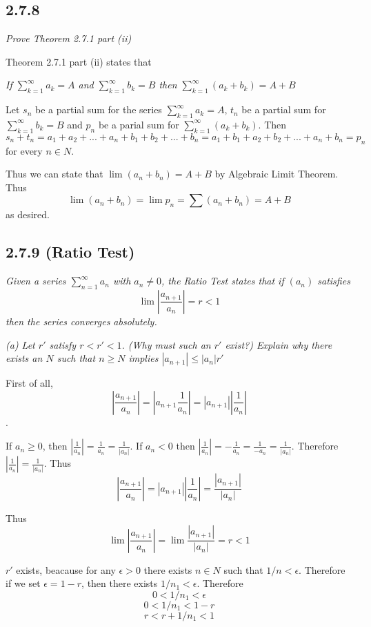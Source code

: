 \documentclass[11pt,oneside,titlepage]{book}
\begin{document}
\subsection*{2.7.8}
\textit{Prove Theorem 2.7.1 part (ii)}

Theorem 2.7.1 part (ii) states that

\textit{If $\sum_{k = 1}^{\infty} a_k = A$ and $\sum_{k = 1}^{\infty} b_k = B$
then $\sum_{k = 1}^{\infty} (a_k + b_k) = A + B$}

Let $s_n$ be a partial sum for the series $\sum_{k = 1}^{\infty} a_k = A$,
$t_n$ be a partial sum for $\sum_{k = 1}^{\infty} b_k = B$ and
$p_n$ be a parial sum for $\sum_{k = 1}^{\infty} (a_k + b_k)$. Then
$$s_n + t_n = a_1 + a_2 + ... + a_n + b_1 + b_2 + ... + b_n =
a_1 + b_1 + a_2 + b_2 + ... + a_n + b_n = p_n $$
for every $n \in N$. 

Thus we can state that $\lim (a_n + b_n) = A + B$ by Algebraic Limit Theorem.
Thus 
$$\lim (a_n + b_n) = \lim p_n = \sum (a_n + b_n) = A + B$$
as desired.

\subsection*{2.7.9 (Ratio Test)}
\textit{Given a series $\sum_{n = 1}^{\infty} a_n$ with $a_n \neq 0$, the
  Ratio Test states that if $(a_n)$ satisfies}
$$\lim|\frac{a_{n + 1}}{a_n}| = r < 1$$
\textit{then the series converges absolutely.}

\textit{(a) Let $r'$ satisfy $r < r' < 1$. (Why must such an $r'$ exist?)
  Explain why there exists an $N$ such that $n \geq N$ implies
  $|a_{n + 1}| \leq |a_n|r'$}

First of all,
$$|\frac{a_{n + 1}}{a_n}| = |a_{n + 1} \frac{1}{a_n}| =
|a_{n + 1}| |\frac{1}{a_n}|$$.

If  $a_n \geq 0$, then $|\frac{1}{a_n}| = \frac{1}{a_n} = \frac{1}{|a_n|}$.
If $a_n < 0$ then $|\frac{1}{a_n}| = - \frac{1}{a_n} = \frac{1}{-a_n} =
\frac{1}{|a_n|}$. Therefore $|\frac{1}{a_n}| = \frac{1}{|a_n|}$. Thus 
$$|\frac{a_{n + 1}}{a_n}| = |a_{n + 1}| |\frac{1}{a_n}| =
\frac{|a_{n + 1}|}{|a_n|}$$

Thus
$$\lim|\frac{a_{n + 1}}{a_n}| = \lim\frac{|a_{n + 1}|}{|a_n|} = r < 1$$

$r'$ exists, beacause for any $\epsilon > 0$ there exists $n \in N$ such that
$1/n < \epsilon$. Therefore if we set $\epsilon = 1 - r$, then there exists
$1/n_1 < \epsilon$. Therefore
$$0 < 1/n_1 < \epsilon$$
$$0 < 1/n_1 < 1 - r$$
$$r < r + 1/n_1 < 1$$
\end{document}
